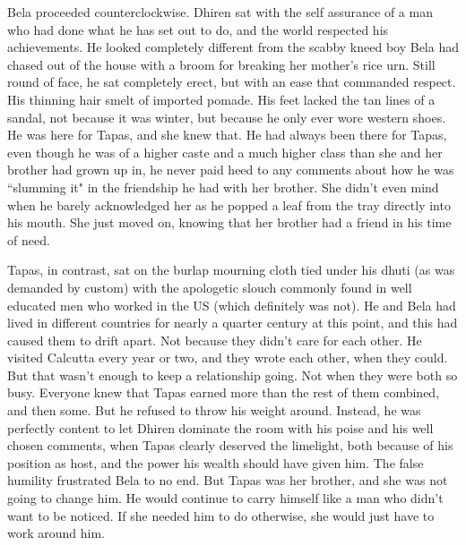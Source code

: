 \documentclass{amsart}
\begin{document}
Bela proceeded counterclockwise. Dhiren sat with the self assurance of a man who had done what he has set out to do, and the world respected his achievements. He looked completely different from the scabby kneed boy Bela had chased out of the house with a broom for breaking her mother's rice urn. Still round of face, he sat completely erect, but with an ease that commanded respect. His thinning hair smelt of imported pomade. His feet lacked the tan lines of a sandal, not because it was winter, but because he only ever wore western shoes. He was here for Tapas, and she knew that. He had always been there for Tapas, even though he was of a higher caste and a much higher class than she and her brother had grown up in, he never paid heed to any comments about how he was ``slumming it" in the friendship he had with her brother. She didn't even mind when he barely acknowledged her as he popped a leaf from the tray directly into his mouth. She just moved on, knowing that her brother had a friend in his time of need.

Tapas, in contrast, sat on the burlap mourning cloth tied under his dhuti (as was demanded by custom) with the apologetic slouch commonly found in well educated men who worked in the US (which definitely was not). He and Bela had lived in different countries for nearly a quarter century at this point, and this had caused them to drift apart. Not because they didn't care for each other. He visited Calcutta every year or two, and they wrote each other, when they could. But that wasn't enough to keep a relationship going. Not when they were both so busy. Everyone knew that Tapas earned more than the rest of them combined, and then some. But he refused to throw his weight around. Instead, he was perfectly content to let Dhiren dominate the room with his poise and his well chosen comments, when Tapas clearly deserved the limelight, both because of his position as host, and the power his wealth should have given him. The false humility frustrated Bela to no end. But Tapas was her brother, and she was not going to change him. He would continue to carry himself like a man who didn't want to be noticed. If she needed him to do otherwise, she would just have to work around him.
\end{document}
